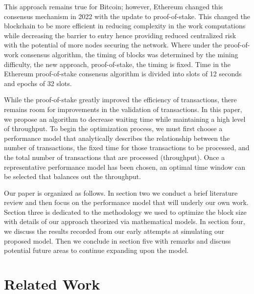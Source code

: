 \documentclass[conference]{IEEEtran}
\begin{document}
This approach remains true for Bitcoin; however, Ethereum changed this consensus 
mechanism in 2022 with the update to proof-of-stake\cite{2022_Ethereum_PoS}. This 
changed the blockchain to be more efficient in reducing complexity in the work 
computations while decreasing the barrier to entry hence providing reduced centralized 
risk with the potential of more nodes securing the network. Where under the proof-of-work
consensus algorithm, the timing of blocks was determined by the mining difficulty, the 
new approach, proof-of-stake, the timing is fixed. Time in the Ethereum proof-of-stake 
consensus algorithm is divided into slots of 12 seconds and epochs of 32 slots.

While the proof-of-stake greatly improved the efficiency of transactions, there remains 
room for improvements in the validation of transactions. In this paper, we propose an 
algorithm to decrease waiting time while maintaining a high level of throughput. To begin 
the optimization process, we must first choose a performance model that analytically 
describes the relationship between the number of transactions, the fixed time for those 
transactions to be processed, and the total number of transactions that are processed 
(throughput). Once a representative performance model has been chosen, an optimal
time window can be selected that balances out the throughput. 

Our paper is organized as follows. In section two we conduct a brief literature review and 
then focus on the performance model that will underly our own work. Section three is 
dedicated to the methodology we used to optimize the block size with details of our 
approach theorized via mathematical models. In section four, we discuss the results recorded 
from our early attempts at simulating our proposed model. Then we conclude in section five 
with remarks and discuss potential future areas to continue expanding upon the model. 

\section{Related Work}\label{related}
\end{document}
